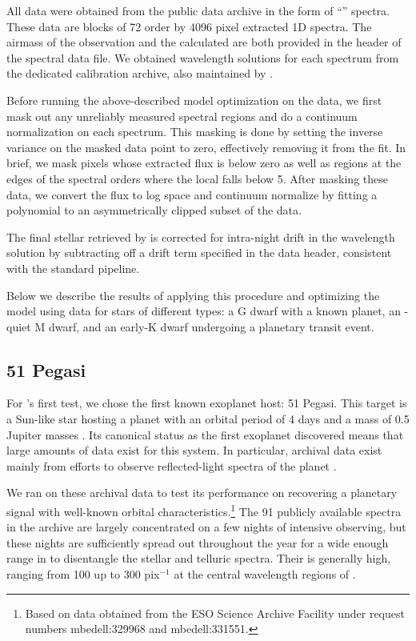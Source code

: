\documentclass[modern]{aastex62}
\begin{document}
All data were obtained from the  public data archive in the form of ``'' spectra.
These data are blocks of 72 order by 4096 pixel extracted 1D spectra.
The airmass of the observation and the calculated \BERV are both provided in the  header of the spectral data file.
We obtained wavelength solutions for each spectrum from the dedicated \HARPS calibration archive, also maintained by .

Before running the above-described model optimization on the data, we first mask out any unreliably measured spectral regions and do a continuum normalization on each spectrum.
This masking is done by setting the inverse variance on the masked data point to zero, effectively removing it from the fit.
In brief, we mask pixels whose extracted flux is below zero as well as regions at the edges of the spectral orders where the local \SNR falls below 5.
After masking these data, we convert the flux to log space and continuum normalize by fitting a polynomial to an asymmetrically clipped subset of the data.

The final stellar \RV retrieved by \wobble is corrected for intra-night drift in the wavelength solution by subtracting off a drift term specified in the data header, consistent with the standard \HARPS pipeline. 

Below we describe the results of applying this procedure and optimizing the \wobble model using \HARPS data for stars of different types: a G dwarf with a known planet, an \RV-quiet M dwarf, and an early-K dwarf undergoing a planetary transit event.

\subsection{51 Pegasi}

For \wobble's first test, we chose the first known exoplanet host: 51 Pegasi.
This target is a Sun-like star hosting a planet with an orbital period of 4 days and a mass of 0.5 Jupiter masses \citep{Mayor1995}.
Its canonical status as the first exoplanet discovered means that large amounts of data exist for this system.
In particular, archival \HARPS data exist mainly from efforts to observe reflected-light spectra of the planet \citep{Martins2015}.

We ran \wobble on these archival data to test its performance on recovering a planetary signal with well-known orbital characteristics.\footnote{Based on data obtained from the ESO Science Archive Facility under request numbers mbedell:329968 and mbedell:331551.}
The 91 publicly available spectra in the \HARPS archive are largely concentrated on a few nights of intensive observing, but these nights are sufficiently spread out throughout the year for a wide enough range in \BERV to disentangle the stellar and telluric spectra.
Their \SNR is generally high, ranging from 100 up to 300 pix$^{-1}$ at the central wavelength regions of \HARPS.
\end{document}

